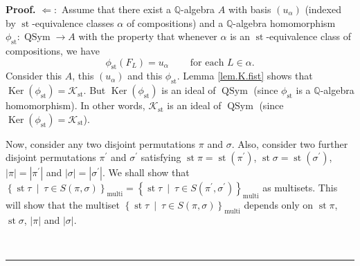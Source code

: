 \documentclass[numbers=enddot,12pt,final,onecolumn,notitlepage]{scrartcl}%
\theoremstyle{definition}
\newenvironment{proof}[1][Proof]{\noindent\textbf{#1.} }{\ \rule{0.5em}{0.5em}}
\newenvironment{verlong}{}{}
\begin{document}
\begin{verlong}
\begin{proof}
$\Longleftarrow:$ Assume that there exist a $\mathbb{Q}$-algebra $A$ with
basis $\left(  u_{\alpha}\right)  $ (indexed by $\operatorname{st}%
$-equivalence classes $\alpha$ of compositions) and a $\mathbb{Q}$-algebra
homomorphism $\phi_{\operatorname{st}}:\operatorname*{QSym}\rightarrow A$
with the property that whenever $\alpha$ is an $\operatorname{st}%
$-equivalence class of compositions, we have%
\[
\phi_{\operatorname{st}}\left(  F_{L}\right)  =u_{\alpha}%
\ \ \ \ \ \ \ \ \ \ \text{for each }L\in\alpha.
\]
Consider this $A$, this $\left(  u_{\alpha}\right)  $ and this $\phi
_{\operatorname{st}}$. Lemma \ref{lem.K.fist} shows that $\operatorname*{Ker}%
\left(  \phi_{\operatorname{st}}\right)  =\mathcal{K}_{\operatorname{st}}$.
But $\operatorname*{Ker}\left(  \phi_{\operatorname{st}}\right)  $ is an
ideal of $\operatorname*{QSym}$ (since $\phi_{\operatorname{st}}$ is a
$\mathbb{Q}$-algebra homomorphism). In other words, $\mathcal{K}%
_{\operatorname{st}}$ is an ideal of $\operatorname*{QSym}$ (since
$\operatorname*{Ker}\left(  \phi_{\operatorname{st}}\right)  =\mathcal{K}%
_{\operatorname{st}}$).

Now, consider any two disjoint permutations $\pi$ and $\sigma$. Also, consider
two further disjoint permutations $\pi^{\prime}$ and $\sigma^{\prime}$
satisfying $\operatorname{st} \pi   =\operatorname{st}\left(
\pi^{\prime}\right)  $, $\operatorname{st} \sigma 
=\operatorname{st}\left(  \sigma^{\prime}\right)  $, $\left\vert
\pi\right\vert =\left\vert \pi^{\prime}\right\vert $ and $\left\vert
\sigma\right\vert =\left\vert \sigma^{\prime}\right\vert $. We shall show that
$\left\{  \operatorname{st} \tau   \ \mid\ \tau\in S\left(
\pi,\sigma\right)  \right\}  _{\operatorname*{multi}} =\left\{
\operatorname{st} \tau   \ \mid\ \tau\in S\left(  \pi^{\prime
},\sigma^{\prime}\right)  \right\}  _{\operatorname*{multi}} $ as multisets.
This will show that the multiset \newline$\left\{  \operatorname{st}
\tau \ \mid\ \tau\in S\left(  \pi,\sigma\right)  \right\}
_{\operatorname*{multi}} $ depends only on $\operatorname{st} \pi$,
$\operatorname{st} \sigma$, $\left\vert \pi\right\vert $ and
$\left\vert \sigma\right\vert $.


\end{proof}
\end{verlong}
\end{document}
